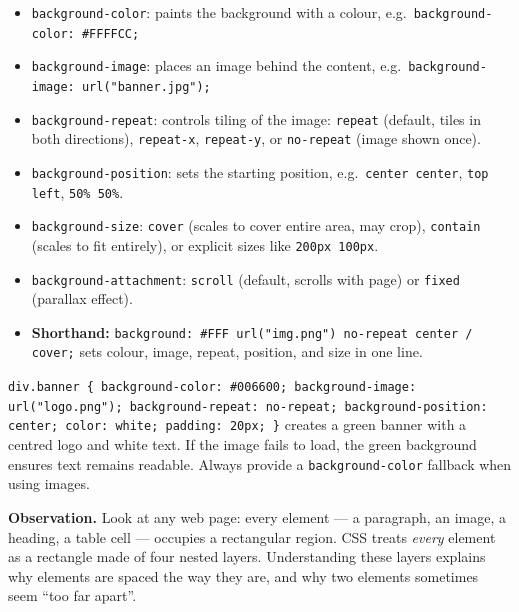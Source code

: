 \documentclass[11pt]{article}
\newcounter{popsec}
\newcounter{popsub}
\newcommand{\courssub}[1]{%
  \stepcounter{popsub}%
  \par\vspace{9pt}\noindent{\popxbold\fontsize{11.5}{13}\selectfont\color{popink}{\color{poporange}\thepopsec.\thepopsub}\hspace{6pt}#1}\par\nopagebreak\vspace{4pt}
}
\begin{document}
\begin{definition}
\begin{itemize}
\item \texttt{background-color}: paints the background with a colour, e.g.\ \texttt{background-color: \#FFFFCC;}
\item \texttt{background-image}: places an image behind the content, e.g.\ \texttt{background-image: url("banner.jpg");}
\item \texttt{background-repeat}: controls tiling of the image: \texttt{repeat} (default, tiles in both directions), \texttt{repeat-x}, \texttt{repeat-y}, or \texttt{no-repeat} (image shown once).
\item \texttt{background-position}: sets the starting position, e.g.\ \texttt{center center}, \texttt{top left}, \texttt{50\% 50\%}.
\item \texttt{background-size}: \texttt{cover} (scales to cover entire area, may crop), \texttt{contain} (scales to fit entirely), or explicit sizes like \texttt{200px 100px}.
\item \texttt{background-attachment}: \texttt{scroll} (default, scrolls with page) or \texttt{fixed} (parallax effect).
\item \textbf{Shorthand:} \texttt{background: \#FFF url("img.png") no-repeat center / cover;} sets colour, image, repeat, position, and size in one line.
\end{itemize}
\end{definition}

\begin{exemplebox}
\texttt{div.banner \{ background-color: \#006600; background-image: url("logo.png"); background-repeat: no-repeat; background-position: center; color: white; padding: 20px; \}} creates a green banner with a centred logo and white text. If the image fails to load, the green background ensures text remains readable. Always provide a \texttt{background-color} fallback when using images.
\end{exemplebox}

\courssub{The CSS Box Model}

\textbf{Observation.} Look at any web page: every element --- a paragraph, an image, a heading, a table cell --- occupies a rectangular region. CSS treats \emph{every} element as a rectangle made of four nested layers. Understanding these layers explains why elements are spaced the way they are, and why two elements sometimes seem ``too far apart''.
\end{document}
